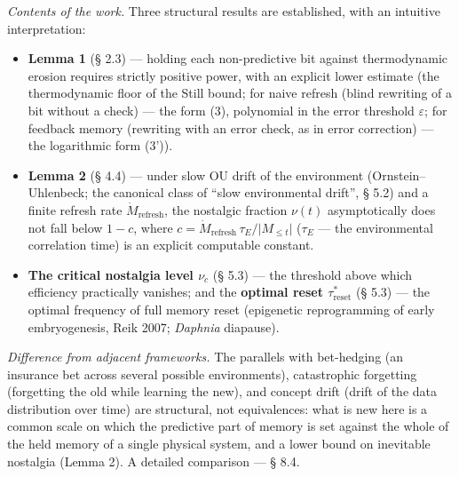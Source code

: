 \documentclass[pdflatex,sn-mathphys-ay]{sn-jnl}
\providecommand{\tightlist}{\setlength{\itemsep}{0pt}\setlength{\parskip}{0pt}}
\begin{document}
\emph{Contents of the work.} Three structural results are established, with an intuitive interpretation:



\begin{itemize}

\tightlist

\item

  \textbf{Lemma 1} (§ 2.3) --- holding each non-predictive bit against thermodynamic erosion requires strictly positive power, with an explicit lower estimate (the thermodynamic floor of the Still bound; for naive refresh (blind rewriting of a bit without a check) --- the form (3), polynomial in the error threshold \(\varepsilon\); for feedback memory (rewriting with an error check, as in error correction) --- the logarithmic form (3')).

\item

  \textbf{Lemma 2} (§ 4.4) --- under slow OU drift of the environment (Ornstein--Uhlenbeck; the canonical class of ``slow environmental drift'', § 5.2) and a finite refresh rate \(\dot M_{\text{refresh}}\), the nostalgic fraction \(\nu(t)\) asymptotically does not fall below \(1 - c\), where \(c = \dot M_{\text{refresh}}\, \tau_E / \lvert M_{\le t}\rvert\) (\(\tau_E\) --- the environmental correlation time) is an explicit computable constant.

\item

  \textbf{The critical nostalgia level \(\nu_c\)} (§ 5.3) --- the threshold above which efficiency practically vanishes; and the \textbf{optimal reset \(\tau_{\text{reset}}^*\)} (§ 5.3) --- the optimal frequency of full memory reset (epigenetic reprogramming of early embryogenesis, Reik 2007; \emph{Daphnia} diapause).

\end{itemize}



\emph{Difference from adjacent frameworks.} The parallels with bet-hedging (an insurance bet across several possible environments), catastrophic forgetting (forgetting the old while learning the new), and concept drift (drift of the data distribution over time) are structural, not equivalences: what is new here is a common scale on which the predictive part of memory is set against the whole of the held memory of a single physical system, and a lower bound on inevitable nostalgia (Lemma 2). A detailed comparison --- § 8.4.
\end{document}
